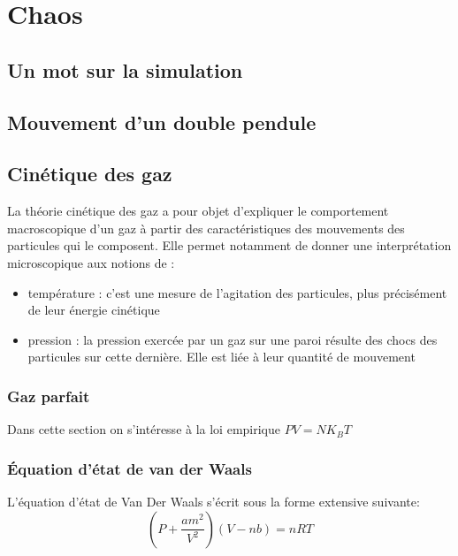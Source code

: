 \chapter{Chaos}
\section{Un mot sur la simulation}
\section{Mouvement d'un double pendule}
\section{Cinétique des gaz}
La théorie cinétique des gaz a pour objet d'expliquer le comportement macroscopique d'un gaz à partir des caractéristiques des mouvements des particules qui le composent. Elle permet notamment de donner une interprétation microscopique aux notions de :
\begin{itemize}
 \item température : c'est une mesure de l'agitation des particules, plus précisément de leur énergie cinétique
 \item pression : la pression exercée par un gaz sur une paroi résulte des chocs des particules sur cette dernière. Elle est liée à leur quantité de mouvement
\end{itemize}

\subsection{Gaz parfait}
Dans cette section on s'intéresse à la loi empirique $PV=NK_{B}T$
\subsection{Équation d'état de van der Waals}
L’équation d'état de Van Der Waals s'écrit sous la forme extensive suivante:
\begin{equation}
\left( P + \frac{am^{2}}{V^{2}} \right) \left(V-nb \right) = nRT
\end{equation}


